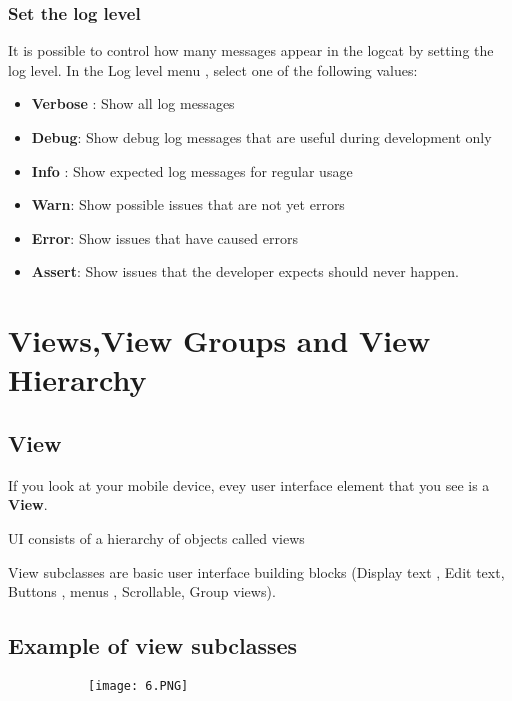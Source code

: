\documentclass{article}
\begin{document}
\subsubsection{Set the log level}

It is possible to control how many messages appear in the logcat by setting the log level. In the Log level menu , select one of the following values:

\begin{itemize}
    \item  \textbf{Verbose} : Show all log messages
    \item  \textbf{Debug}: Show debug log messages that are useful during development only
    \item  \textbf{Info} : Show expected log messages for regular usage
    \item  \textbf{Warn}: Show possible issues that are not yet errors
    \item  \textbf{Error}: Show issues that have caused errors
    \item  \textbf{Assert}: Show issues that the developer expects should never happen.

\end{itemize}

\section{Views,View Groups and View Hierarchy}

\subsection{View}

If you look at your mobile device, evey user interface element that you see is a \textbf{View}.

UI consists of a hierarchy of objects called views

View subclasses are basic user interface building blocks (Display text , Edit text, Buttons , menus , Scrollable, Group views).

\subsection{Example of view subclasses}

\begin{figure}[ht!]
  \centering
  \begin{subfigure}[b]{0.8\linewidth}
    \texttt{[image: 6.PNG]}
  \end{subfigure}
\end{figure}
\end{document}
